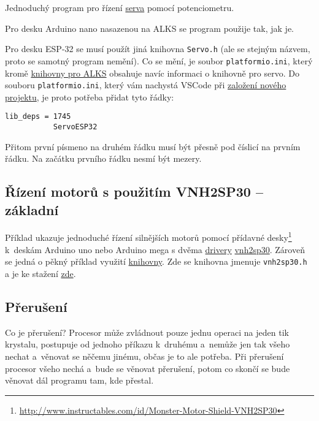 Jednoduchý program pro řízení \hyperref[servo]{serva} pomocí potenciometru.

Pro desku Arduino nano nasazenou na ALKS se program použije tak, jak je. 

Pro desku ESP-32 se musí použít jiná knihovna {\tt Servo.h} (ale se stejným názvem, proto se samotný program nemění). 
Co se mění, je soubor {\tt platformio.ini}, který kromě \hyperref[alks:knihovna]{knihovny pro ALKS} obsahuje navíc informaci o knihovně pro servo. Do souboru  {\tt platformio.ini}, který vám nachystá VSCode při 
 \hyperref[vsc:newproject]{založení nového projektu}, je proto potřeba přidat tyto řádky: 
\begin{verbatim}
lib_deps = 1745
           ServoESP32
\end{verbatim}
 Přitom první písmeno  na druhém řádku musí být přesně pod číslicí  na prvním řádku. Na začátku prvního řádku nesmí být mezery. 






\label{prog:vnh2sp30} \label{prog:knihovna} 
\subsection{Řízení motorů s použitím VNH2SP30 -- základní} 

Příklad ukazuje jednoduché řízení silnějších motorů pomocí přídavné 
desky\footnote{\url{http://www.instructables.com/id/Monster-Motor-Shield-VNH2SP30}
	} k~deskám Arduino uno nebo Arduino mega  s dvěma \hyperref[driver]{drivery}
  \hyperref[vnh2sp30]{vnh2sp30}.  Zároveň se jedná o pěkný příklad využití \hyperref[knihovna]{knihovny}. Zde se knihovna jmenuje {\tt vnh2sp30.h} a je ke stažení 
  \href{https://github.com/RoboticsBrno/RoboticsBrno-guides/tree/RoboticsManual/RoboticsManual/priklady_c}{zde}.




\subsection{Přerušení} \label{preruseni} 

Co je přerušení? Procesor může zvládnout pouze jednu operaci na jeden tik krystalu, 
postupuje od jednoho příkazu k~druhému a~nemůže jen tak všeho nechat a~věnovat se něčemu jinému, občas je to ale potřeba.
Při přerušení procesor všeho nechá a~bude se věnovat přerušení, potom co skončí se bude věnovat dál programu tam, kde přestal. 




